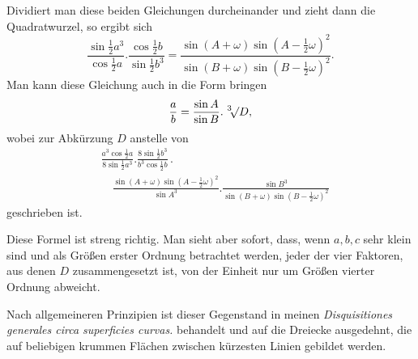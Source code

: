 \noindent Dividiert man diese beiden Gleichungen durcheinander und zieht dann die Quadratwurzel, so ergibt sich
\[
\frac{\sin\tfrac12 a^3}{\cos\tfrac12 a}.\frac{\cos\tfrac12 b}{\sin\tfrac12 b^3}
=\frac{\sin(A+\omega)\sin(A-\tfrac12\omega)^2}{\sin(B+\omega)\sin(B-\tfrac12\omega)^2}.
\]
\noindent Man kann diese Gleichung auch in die Form bringen
\[
\frac ab=\frac{\sin A}{\sin B}.\mkern6mu{}^3\mkern-4mu\mathord{\surd}D,
\]
\noindent wobei zur Abkürzung $D$ anstelle von
\[
\begin{aligned}
&\frac{a^3\cos\tfrac12 a}{8\sin\tfrac12 a^3}.\frac{8\sin\tfrac12 b^3}{b^3\cos\tfrac12 b}\, .\\[5pt]
&\quad\frac{\sin(A+\omega)\sin(A-\tfrac12\omega)^2}{\sin A^3}.\frac{\sin B^3}{\sin(B+\omega)\sin(B-\tfrac12\omega)^2}
\end{aligned}
\]
\noindent geschrieben ist.

Diese Formel ist streng richtig. Man sieht aber sofort, dass, wenn $a,b,c$ sehr klein sind und als Größen erster Ordnung betrachtet werden, jeder der vier Faktoren, aus denen $D$ zusammengesetzt ist, von der Einheit nur um Größen vierter Ordnung abweicht.

Nach allgemeineren Prinzipien ist dieser Gegenstand in meinen \textit{Disquisitiones generales circa superficies curvas.} behandelt und auf die Dreiecke ausgedehnt, die auf beliebigen krummen Flächen zwischen kürzesten Linien gebildet werden.

